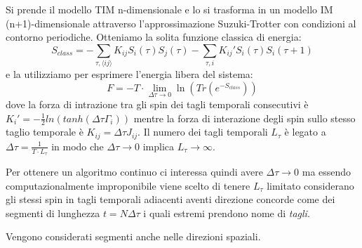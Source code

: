Si prende il modello TIM n-dimensionale e lo si trasforma in un modello IM (n+1)-dimensionale attraverso l'approssimazione Suzuki-Trotter con condizioni al contorno periodiche. Otteniamo la solita funzione classica di energia:
$$S_{class} = - \sum_{\tau,\langle ij \rangle} K_{ij} S_i(\tau) S_j(\tau) - \sum_{\tau, i} K_{ij}' S_i(\tau) S_i(\tau+1)$$
e la utilizziamo per esprimere l'energia libera del sistema:
$$F = - T \cdot \lim_{\Delta \tau \to 0} \ln(Tr(e^{-S_{class}}))$$
dove la forza di intrazione tra gli spin dei tagli temporali consecutivi è $K_{i}' = - \frac{1}{2} ln( tanh( \Delta \tau \Gamma_i) )$ mentre la forza di interazione degli spin sullo stesso taglio temporale è $K_{ij} = \Delta \tau J_{ij}$. Il numero dei tagli temporali $L_{\tau}$ è legato a $\Delta \tau = \frac{1}{T \cdot L_{\tau}}$ in modo che $\Delta \tau \to 0$ implica $L_{\tau} \to \infty$.

Per ottenere un algoritmo continuo ci interessa quindi avere $\Delta \tau \to 0$ ma essendo computazionalmente improponibile viene scelto di tenere $L_{\tau}$ limitato considerano gli stessi spin in tagli temporali adiacenti aventi direzione concorde come dei segmenti di lunghezza $t = N \Delta \tau$ i quali estremi prendono nome di \textit{tagli}.

Vengono considerati segmenti anche nelle direzioni spaziali.

